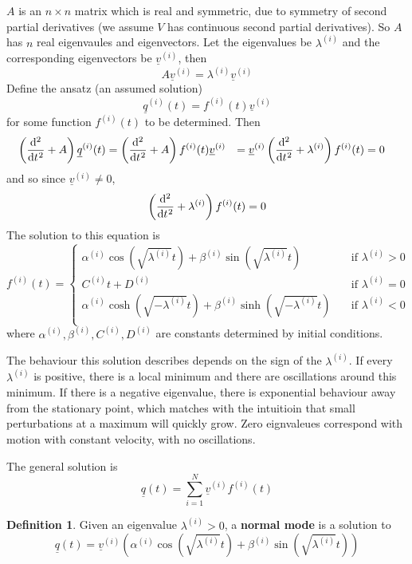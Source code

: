\documentclass[12pt,a4paper]{article}
\theoremstyle{definition}
\newtheorem{definition}{Definition}[subsection]
\begin{document}
$A$ is an $n \times n$ matrix which is real and symmetric, due to symmetry of second partial derivatives (we assume $V$ has continuous second partial derivatives). So $A$ has $n$ real eigenvaules and eigenvectors. Let the eigenvalues be $\lambda^{(i)}$ and the corresponding eigenvectors be $\underline{v}^{(i)}$, then
\[
	A \underline{v}^{(i)} = \lambda^{(i)} \underline{v}^{(i)}
\]
Define the ansatz (an assumed solution)
\[
	\underline{q}^{(i)} (t) = f^{(i)} (t) \underline{v}^{(i)}
\]
for some function $f^{(i)} (t)$ to be determined. Then
\[
	\begin{aligned}
		\left( \diff[2]{}{t} + A \right) \underline{q}^{(i)} (t)
			& = \left( \diff[2]{}{t} + A \right) f^{(i)} (t) \underline{v}^{(i)}
			& = \underline{v}^{(i)} \left( \diff[2]{}{t} + \lambda^{(i)} \right) f^{(i)} (t)
			& = 0
	\end{aligned}
\]
and so since $\underline{v}^{(i)} \ne 0$,
\[
	\left( \diff[2]{}{t} + \lambda^{(i)} \right) f^{(i)} (t) = 0
\]
The solution to this equation is
\[
	f^{(i)} (t) = \begin{cases}
		\alpha^{(i)} \cos(\sqrt{\lambda^{(i)}} t) + \beta^{(i)} \sin(\sqrt{\lambda^{(i)}} t) & \quad \text{if } \lambda^{(i)} > 0 \\
		C^{(i)} t + D^{(i)} & \quad \text{if } \lambda^{(i)} = 0 \\
		\alpha^{(i)} \cosh(\sqrt{-\lambda^{(i)}} t) + \beta^{(i)} \sinh(\sqrt{-\lambda^{(i)}} t) & \quad \text{if } \lambda^{(i)} < 0 \\
	\end{cases}
\]
where $\alpha^{(i)}, \beta^{(i)}, C^{(i)}, D^{(i)}$ are constants determined by initial conditions.

The behaviour this solution describes depends on the sign of the $\lambda^{(i)}$. If every $\lambda^{(i)}$ is positive, there is a local minimum and there are oscillations around this minimum. If there is a negative eigenvalue, there is exponential behaviour away from the stationary point, which matches with the intuitioin that small perturbations at a maximum will quickly grow. Zero eignvaleues correspond with motion with constant velocity, with no oscillations.

The general solution is
\[
	\underline{q}(t) = \sum_{i = 1}^{N} \underline{v}^{(i)} f^{(i)} (t)
\]

\begin{definition}
	Given an eigenvalue $\lambda^{(i)} > 0$, a \textbf{normal mode} is a solution to
	\[
		\underline{q}(t) = \underline{v}^{(i)} \left( \alpha^{(i)} \cos(\sqrt{\lambda^{(i)}} t) + \beta^{(i)} \sin(\sqrt{\lambda^{(i)}} t) \right)
	\]
\end{definition}
\end{document}
